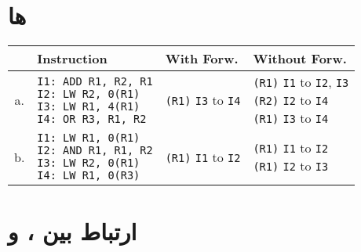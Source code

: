\documentclass[11pt, dvipsnames, svgnames, x11names]{article}
\begin{document}
\section{ها}

\begin{latin}
\begin{table}[H]
\begin{adjustbox}{width=\textwidth}
\begin{tabular}{|c|l|l|l|}
\hline
& Instruction & With Forw. & Without Forw.\\
\hline
a. &
\makecell[l]{
\texttt{I1: ADD R1, R2, R1} \\ 
\texttt{I2: LW R2, 0(R1)} \\ 
\texttt{I3: LW R1, 4(R1)} \\
\texttt{I4: OR R3, R1, R2}} &
\texttt{(R1)} \texttt{I3} to \texttt{I4}&
\makecell[l]{
\texttt{(R1)} \texttt{I1} to \texttt{I2}, \texttt{I3} \\
\texttt{(R2)} \texttt{I2} to \texttt{I4} \\
\texttt{(R1)} \texttt{I3} to \texttt{I4} 
}\\ 
\hline
b. &
\makecell[l]{
\texttt{I1: LW R1, 0(R1)} \\ 
\texttt{I2: AND R1, R1, R2} \\ 
\texttt{I3: LW R2, 0(R1)} \\
\texttt{I4: LW R1, 0(R3)}} &
\texttt{(R1)} \texttt{I1} to \texttt{I2}&
\makecell[l]{
\texttt{(R1)} \texttt{I1} to \texttt{I2} \\
\texttt{(R1)} \texttt{I2} to \texttt{I3} 
}\\
\hline
\end{tabular}
\end{adjustbox}
\end{table}
\end{latin}

\section{ارتباط بین ،  و }
\end{document}

